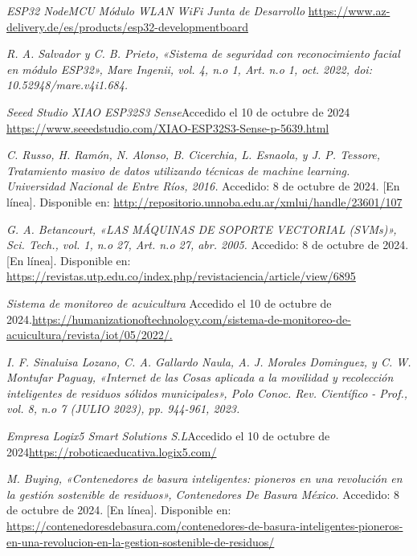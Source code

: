 \begin{thebibliography}{99}
    \textit{ESP32 NodeMCU Módulo WLAN WiFi Junta de Desarrollo} \url{https://www.az-delivery.de/es/products/esp32-developmentboard}
    
    \textit{R. A. Salvador y C. B. Prieto, «Sistema de seguridad con reconocimiento facial en módulo ESP32», Mare Ingenii, vol. 4, n.o 1, Art. n.o 1, oct. 2022, doi: 10.52948/mare.v4i1.684.}

    \textit{Seeed Studio XIAO ESP32S3 Sense}Accedido el 10 de octubre de 2024 \url{https://www.seeedstudio.com/XIAO-ESP32S3-Sense-p-5639.html}
    
    \textit{C. Russo, H. Ramón, N. Alonso, B. Cicerchia, L. Esnaola, y J. P. Tessore, Tratamiento masivo de datos utilizando técnicas de machine learning. Universidad Nacional de Entre Ríos, 2016.} Accedido: 8 de octubre de 2024. [En línea]. Disponible en: \url{http://repositorio.unnoba.edu.ar/xmlui/handle/23601/107}
    
    \textit{G. A. Betancourt, «LAS MÁQUINAS DE SOPORTE VECTORIAL (SVMs)», Sci. Tech., vol. 1, n.o 27, Art. n.o 27, abr. 2005.} Accedido: 8 de octubre de 2024. [En línea]. Disponible en: \url{https://revistas.utp.edu.co/index.php/revistaciencia/article/view/6895}

    \textit{Sistema de monitoreo de acuicultura} Accedido el 10 de octubre de 2024.\url{https://humanizationoftechnology.com/sistema-de-monitoreo-de-acuicultura/revista/iot/05/2022/.}
    
    \textit{I. F. Sinaluisa Lozano, C. A. Gallardo Naula, A. J. Morales Dominguez, y C. W. Montufar Paguay, «Internet de las Cosas aplicada a la movilidad y recolección inteligentes de residuos sólidos municipales», Polo Conoc. Rev. Científico - Prof., vol. 8, n.o 7 (JULIO 2023), pp. 944-961, 2023.}

    \textit{Empresa Logix5 Smart Solutions S.L}Accedido el 10 de octubre de 2024\url{https://roboticaeducativa.logix5.com/}
    
    \textit{M. Buying, «Contenedores de basura inteligentes: pioneros en una revolución en la gestión sostenible de residuos», Contenedores De Basura México.} Accedido: 8 de octubre de 2024. [En línea]. Disponible en: \url{https://contenedoresdebasura.com/contenedores-de-basura-inteligentes-pioneros-en-una-revolucion-en-la-gestion-sostenible-de-residuos/}
    

\end{thebibliography}

